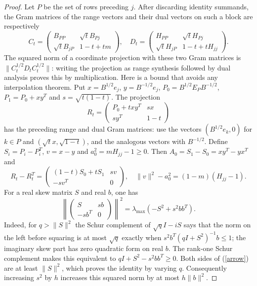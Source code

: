 \documentclass[reqno,a4paper,12pt]{amsart}
\begin{document}
\begin{proof}
Let $P$ be the set of rows preceding $j$. After discarding identity
summands, the Gram matrices of the range vectors and their dual vectors
on such a block are respectively
\[
 C_t=\begin{pmatrix}B_{PP}&\sqrt t B_{Pj}\\
 \sqrt t B_{jP}&1-t+tm\end{pmatrix},\quad
 D_t=\begin{pmatrix}H_{PP}&\sqrt t H_{Pj}\\
 \sqrt t H_{jP}&1-t+tH_{jj}\end{pmatrix}.
\]
The squared norm of a coordinate projection with these two Gram matrices
is $\|C_t^{1/2}D_tC_t^{1/2}\|$: writing the projection as range synthesis
followed by dual analysis proves this by multiplication.
Here is a bound that avoids any interpolation theorem.
Put $x=B^{1/2}e_j$, $y=B^{-1/2}e_j$,
$P_0=B^{1/2}E_PB^{-1/2}$, $P_1=P_0+xy^T$ and $s=\sqrt{t(1-t)}$.
The projection
\[
 R_t=\begin{pmatrix}P_0+txy^T&sx\\sy^T&1-t\end{pmatrix}
\]
has the preceding range and dual Gram matrices: use the vectors
$(B^{1/2}e_k,0)$ for $k\in P$ and $(\sqrt t x,\sqrt{1-t})$,
and the analogous vectors with $B^{-1/2}$. Define
$S_i=P_i-P_i^T$, $v=x-y$ and $a_0^2=mH_{jj}-1\ge0$.
Then $A_0=S_1-S_0=xy^T-yx^T$ and
\[
 R_t-R_t^T=\begin{pmatrix}(1-t)S_0+tS_1&sv\\-sv^T&0\end{pmatrix},
 \quad \|v\|^2-a_0^2=(1-m)(H_{jj}-1).
\]
For a real skew matrix $S$ and real $b$, one has
\begin{equation}\label{arrow}
 \left\|\begin{pmatrix}S&sb\\-sb^T&0\end{pmatrix}\right\|^2
 =\lambda_{\max}(-S^2+s^2bb^T).
\end{equation}
Indeed, for $q>\|S\|^2$ the Schur complement of
$\sqrt q I-iS$ says that the norm on the left before squaring is
at most $\sqrt q$ exactly when
$s^2b^T(qI+S^2)^{-1}b\le1$; the imaginary skew part has zero quadratic
form on real $b$. The rank-one Schur complement makes this equivalent
to $qI+S^2-s^2bb^T\ge0$. Both sides of (\ref{arrow}) are at least
$\|S\|^2$, which proves the identity by varying $q$.
Consequently increasing $s^2$ by $h$ increases this squared norm by
at most $h\|b\|^2$.


\end{proof}
\end{document}
